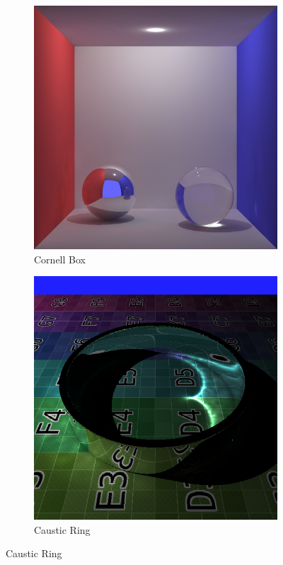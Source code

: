 \begin{figure}
\centering
	\begin{subfigure}[b]{0.6\textwidth}
	\includegraphics[width=\textwidth]{./images/renders/cornell_box.png}
	\caption{Cornell Box}
	\end{subfigure}

	\begin{subfigure}[b]{0.6\textwidth}
	\includegraphics[width=\textwidth]{./images/renders/caustic_ring.png}
	\caption{Caustic Ring}
	\end{subfigure}
\end{figure}


